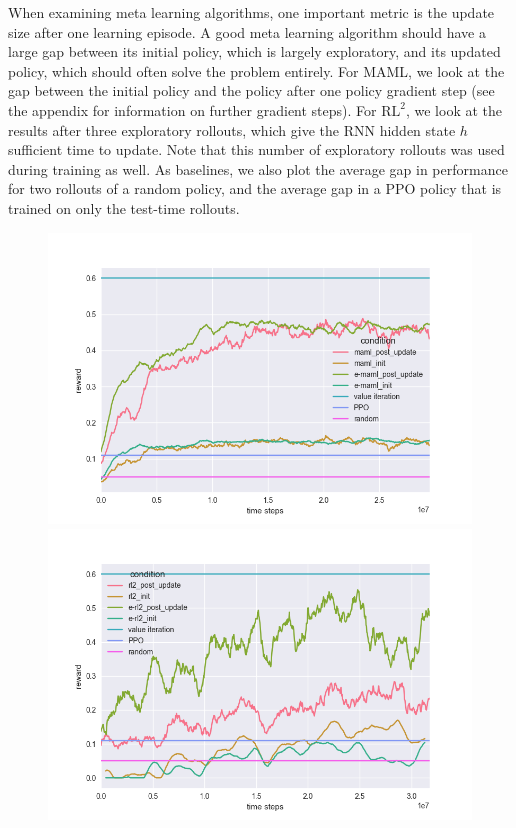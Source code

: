 \documentclass{article} %
\begin{document}
 
When examining meta learning algorithms, one important metric is the update size after one learning episode. A good meta learning algorithm should have a large gap between its initial policy, which is largely exploratory, and its updated policy, which should often solve the problem entirely. For MAML, we look at the gap between the initial policy and the policy after one policy gradient step (see the appendix for information on further gradient steps). For $\text{RL}^2$, we look at the results after three exploratory rollouts, which give the RNN hidden state $h$ sufficient time to update. Note that this number of exploratory rollouts was used during training as well. As baselines, we also plot the average gap in performance for two rollouts of a random policy, and the average gap in a PPO policy that is trained on only the test-time rollouts. 
\begin{figure}[H]
\begin{center}
\includegraphics[scale=0.335]{bradly_curves/gap_grids_maml_0.png}%
\includegraphics[scale=0.335]{bradly_curves/gap_grids_rl2_0.png} \\

\end{center}
\end{figure}
\end{document}
